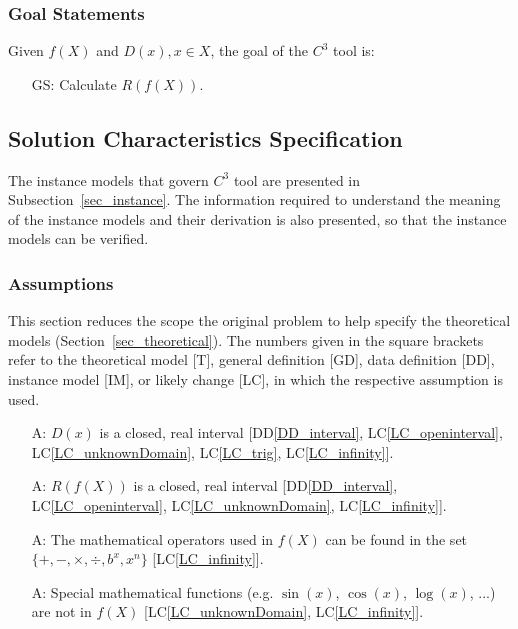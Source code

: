 \documentclass[12pt]{article}
\newcommand{\ddref}[1]{DD\ref{#1}}
\newcounter{assumpnum} %
\newcounter{goalnum} %
\newcommand{\lcref}[1]{LC\ref{#1}}
\newcommand{\prognameAbbrv}{$C^{3}$}
\begin{document}
\subsubsection{Goal Statements}

\noindent Given $f(X)$ and $D(x), x \in X$, the goal of the \prognameAbbrv{} 
tool is:

\begin{itemize}

\item[GS\refstepcounter{goalnum}\thegoalnum \label{G_range}:] 
Calculate $R(f(X))$.


\end{itemize}

\subsection{Solution Characteristics Specification}
The instance models that govern \prognameAbbrv{} tool are presented in
Subsection~\ref{sec_instance}. The information required to understand the 
meaning of the instance models and their derivation is also presented, so that 
the instance models can be verified.

\subsubsection{Assumptions}
This section reduces the scope the original problem to help specify the 
theoretical models (Section~\ref{sec_theoretical}). The numbers given in the 
square brackets refer to the theoretical model [T], general definition [GD], 
data definition [DD], instance model [IM], or likely change [LC], in which the 
respective assumption is used.

\begin{itemize}

\item[A\refstepcounter{assumpnum}\theassumpnum \label{A_domain}:] $D(x)$ is a 
closed, real interval [\ddref{DD_interval}, \lcref{LC_openinterval}, 
\lcref{LC_unknownDomain}, \lcref{LC_trig}, \lcref{LC_infinity}]. 

\item[A\refstepcounter{assumpnum}\theassumpnum \label{A_interval}:] $R(f(X))$ 
is a closed, real interval [\ddref{DD_interval}, \lcref{LC_openinterval}, 
\lcref{LC_unknownDomain}, \lcref{LC_infinity}].

\item[A\refstepcounter{assumpnum}\theassumpnum \label{A_operators}:] The 
mathematical operators used in $f(X)$ can be found in the set $\{+, -, 
\times, \div, b^x, x^n \}$ [\lcref{LC_infinity}].

\item[A\refstepcounter{assumpnum}\theassumpnum \label{A_commonfunctions}:] 
Special mathematical functions (e.g. $\sin(x)$, $\cos(x)$, $\log(x)$, ...) are 
not in $f(X)$ [\lcref{LC_unknownDomain}, \lcref{LC_infinity}].

\end{itemize}
\end{document}
